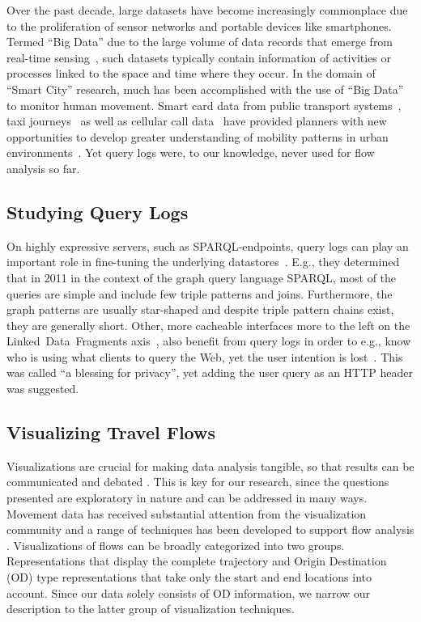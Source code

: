 \documentclass{sig-alternate}
\newcommand{\sparql}{{SPARQL}\xspace}
\begin{document}
Over the past decade, large datasets have become increasingly commonplace due to the proliferation of sensor networks and portable devices like smartphones.
Termed ``Big Data'' due to the large volume of data records that emerge from real-time sensing~\cite{kitchin}, such datasets typically contain information of activities or processes linked to the space and time where they occur.
In the domain of ``Smart City'' research, much has been accomplished with the use of ``Big Data'' to monitor human movement.
Smart card data from public transport systems~\cite{roth,beecham}, taxi journeys~\cite{ferreira} as well as cellular call data~\cite{sevtsuk} have provided planners with new opportunities to develop greater understanding of mobility patterns in urban environments~\cite{batty}.
Yet query logs were, to our knowledge, never used for flow analysis so far.

\subsection{Studying Query Logs}

On highly expressive servers, such as \sparql-endpoints, query logs can play an important role in fine-tuning the underlying datastores~\cite{arias2011empirical}.
E.g., they determined that in 2011 in the context of the graph query language \sparql, most of the queries are simple and include few triple patterns and joins.
Furthermore, the graph patterns are usually star-shaped and despite triple pattern chains exist, they are generally short.
Other, more cacheable interfaces more to the left on the Linked~Data~Fragments axis~\cite{ldf}, also benefit from query logs in order to e.g., know who is using what clients to query the Web, yet the user intention is lost~\cite{usewod2015}.
This was called ``a blessing for privacy'', yet adding the user query as an HTTP header was suggested.

\subsection{Visualizing Travel Flows}

Visualizations are crucial for making data analysis tangible, so that results can be communicated and debated \cite{robinson2008collaborative}. 
This is key for our research, since the questions presented are exploratory in nature \cite{kraak2008exploratory} and can be addressed in many ways. 
Movement data has received substantial attention from the visualization community and a range of techniques has been developed to support flow analysis \cite{andrienko2012visual}. 
Visualizations of flows can be broadly categorized into two groups. 
Representations that display the complete trajectory and Origin Destination (OD) type representations that take only the start and end locations into account.
Since our data solely consists of OD information, we narrow our description to the latter group of visualization techniques.
\end{document}

